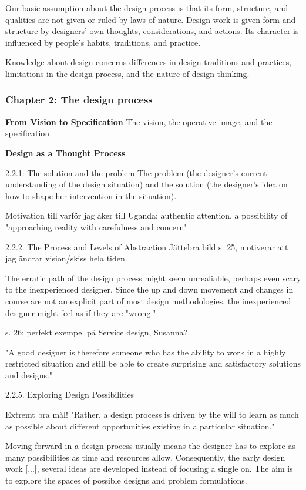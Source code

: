 Our basic assumption about the design process is that its form, structure, and qualities are not given or ruled by laws of nature. Design work is given form and structure by designers’ own thoughts, considerations, and actions. Its character is influenced by people’s habits, traditions, and practice.

Knowledge about design concerns differences in design traditions and practices, limitations in the design process, and the nature of design thinking. %

\subsubsection{Chapter 2: The design process}

\textbf{From Vision to Specification}
The vision, the operative image, and the specification

\textbf{Design as a Thought Process}

2.2.1: The solution and the problem
The problem (the designer's current understanding of the design situation) and the solution (the designer's idea on how to shape her intervention in the situation).

Motivation till varför jag åker till Uganda: authentic attention, a possibility of "approaching reality with carefulness and concern"

2.2.2. The Process and Levels of Abstraction
Jättebra bild s. 25, motiverar att jag ändrar vision/skiss hela tiden.

The erratic path of the design process might seem unrealiable, perhaps even scary to the inexperienced designer. Since the up and down movement and changes in course are not an explicit part of most design methodologies, the inexperienced designer might feel as if they are "wrong."

s. 26: perfekt exempel på Service design, Susanna?

"A good designer is therefore someone who has the ability to work in a highly restricted situation and still be able to create surprising and satisfactory solutions and designs."

2.2.5. Exploring Design Possibilities

Extremt bra mål! "Rather, a design process is driven by the will to learn as much as possible about different opportunities existing in a particular situation."

Moving forward in a design process usually means the designer has to explore as many possibilities as time and resources allow. Consequently, the early design work [...], several ideas are developed instead of focusing a single on. The aim is to explore the spaces of possible designs and problem formulations.


